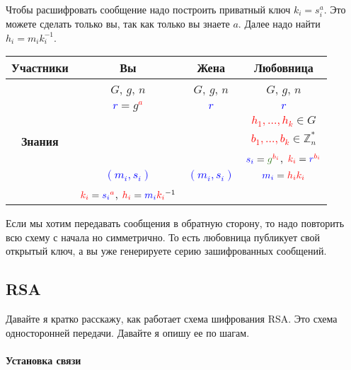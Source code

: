 Чтобы расшифровать сообщение надо построить приватный ключ $k_i = s_i^a$. Это можете сделать только вы, так как только вы знаете $a$. Далее надо найти $h_i = m_i k_i^{-1}$.
\begin{center}
\begin{tabular}{|c|c|c|c|}
\hline
{\bf Участники}&{Вы}&{Жена}&{Любовница}\\
\hline
\multirow{7}{*}{\bf Знания}&{\textcolor{OliveGreen}{$G$}, \textcolor{OliveGreen}{$g$}, \textcolor{OliveGreen}{$n$}}&{\textcolor{OliveGreen}{$G$}, \textcolor{OliveGreen}{$g$}, \textcolor{OliveGreen}{$n$}}&{\textcolor{OliveGreen}{$G$}, \textcolor{OliveGreen}{$g$}, \textcolor{OliveGreen}{$n$}}\\
{}&{ \textcolor{blue}{$r$}$=$\textcolor{OliveGreen}{$ g$}\textcolor{red}{${}^a$}}&{\textcolor{blue}{$r$}}&{\textcolor{blue}{$r$}}\\
{}&{}&{}&{\textcolor{red}{$h_1,\ldots,h_k$}$\in G$}\\
{}&{}&{}&{\textcolor{red}{$b_1,\ldots,b_k$}$\in \mathbb Z_n^*$}\\
{}&{}&{}&{$\textcolor{blue}{s_i} = \textcolor{OliveGreen}{g}^{\textcolor{red}{b_i}}$, $\textcolor{red}{k_i} = \textcolor{blue}{r}^{\textcolor{red}{b_i}}$}\\
{}&{\textcolor{blue}{$(m_i, s_i)$}}&{\textcolor{blue}{$(m_i, s_i)$}}&{$\textcolor{blue}{m_i} = \textcolor{red}{h_i k_i}$}\\
{}&{$\textcolor{red}{k_i} = \textcolor{blue}{s_i}^{\textcolor{red}{a}}$, $\textcolor{red}{h_i} = \textcolor{blue}{m_i} \textcolor{red}{k_i}^{-1}$}&{}&{}\\
\hline
\end{tabular}
\end{center}

Если мы хотим передавать сообщения в обратную сторону, то надо повторить всю схему с начала но симметрично. То есть любовница публикует свой открытый ключ, а вы уже генерируете серию зашифрованных сообщений.

\subsection{RSA}

Давайте я кратко расскажу, как работает схема шифрования RSA. Это схема односторонней передачи. Давайте я опишу ее по шагам.

\paragraph{Установка связи}

